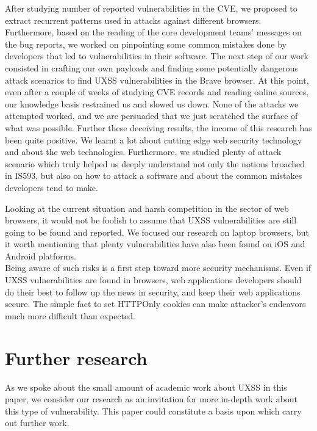\documentclass[journal]{IEEEtran}
\begin{document}
After studying number of reported vulnerabilities in the CVE, we proposed to extract recurrent patterns used in attacks against different browsers. Furthermore, based on the reading of the core development teams' messages on the bug reports, we worked on pinpointing some common mistakes done by developers that led to vulnerabilities in their software. The next step of our work consisted in crafting our own payloads and finding some potentially dangerous attack scenarios to find UXSS vulnerabilities in the Brave browser. At this point, even after a couple of weeks of studying CVE records and reading online sources, our knowledge basis restrained us and slowed us down. None of the attacks we attempted worked, and we are persuaded that we just scratched the surface of what was possible. Further these deceiving results, the income of this research has been quite positive. We learnt a lot about cutting edge web security technology and about the web technologies. Furthermore, we studied plenty of attack scenario which truly helped us deeply understand not only the notions broached in IS593, but also on how to attack a software and about the common mistakes developers tend to make. 

\medskip

Looking at the current situation and harsh competition in the sector of web browsers, it would not be foolish to assume that UXSS vulnerabilities are still going to be found and reported. We focused our research on laptop browsers, but it worth mentioning that plenty vulnerabilities have also been found on iOS and Android platforms. \\
Being aware of such risks is a first step toward more security mechanisms. Even if UXSS vulnerabilities are found in browsers, web applications developers should do their best to follow up the news in security, and keep their web applications secure. The simple fact to set HTTPOnly cookies can make attacker's endeavors much more difficult than expected.


\section{Further research}

As we spoke about the small amount of academic work about UXSS in this paper, we consider our research as an invitation for more in-depth work about this type of vulnerability. This paper could constitute a basis upon which carry out further work.

\medskip
\end{document}
